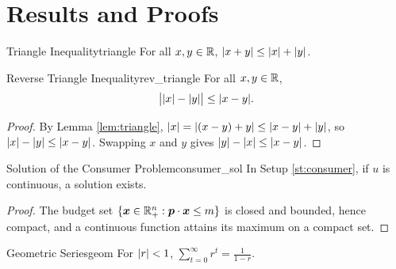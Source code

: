 \section{Results and Proofs}
%
\begin{lembox}{Triangle Inequality}{triangle}
For all $x,y\in\R$, $\abs{x+y}\le\abs{x}+\abs{y}$.
\end{lembox}
%
\begin{thmbox}{Reverse Triangle Inequality}{rev_triangle}
For all $x,y\in\R$,
\[
\abs[\big]{\abs{x}-\abs{y}}\le\abs{x-y}.
\]
\tcbline
\begin{proof}
By Lemma \ref{lem:triangle}, $\abs{x}=\abs{(x-y)+y}\le\abs{x-y}+\abs{y}$, so $\abs{x}-\abs{y}\le\abs{x-y}$. Swapping $x$ and $y$ gives $\abs{y}-\abs{x}\le\abs{x-y}$.
\end{proof}
\end{thmbox}
%
\begin{prpbox}{Solution of the Consumer Problem}{consumer_sol}
In Setup \ref{st:consumer}, if $u$ is continuous, a solution exists.
\tcbline
\begin{proof}
The budget set $\cb{\bs x\in\R^n_+:\bs p\cdot\bs x\le m}$ is closed and bounded, hence compact, and a continuous function attains its maximum on a compact set.
\end{proof}
\end{prpbox}
%
\begin{fctbox}{Geometric Series}{geom}
For $\abs{r}<1$, $\sum_{t=0}^\infty r^t=\frac{1}{1-r}$.
\end{fctbox}
%
